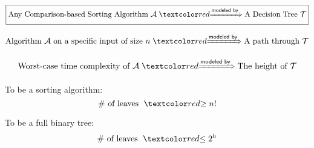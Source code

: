\begin{frame}{}
  \begin{center}
    {\Large {}} 
  \end{center}

  \vspace{-0.40cm}
  \[
    \boxed{\text{Any Comparison-based Sorting Algorithm } \mathcal{A} \;\red{\xRightarrow{\textsf{modeled by}}}\; \text{A Decision Tree } \mathcal{T}}
  \]

  \pause
  \[
    \text{Algorithm $\mathcal{A}$ on a specific input of size } n \;\red{\xRightarrow{\textsf{modeled by}}}\; \text{A path through } \mathcal{T}
  \]

  \pause
  \[
    \text{Worst-case time complexity of $\mathcal{A}$} \;\red{\xRightarrow{\textsf{modeled by}}}\; \text{The height of } \mathcal{T}
  \]

  \pause
  \vspace{0.50cm}
  \centering
\end{frame}

\begin{frame}{}
  \centering

  \pause
  \vspace{0.30cm}
  \begin{alertblock}{To be a  sorting algorithm:}
    \[
      \# \text{ of leaves } \;\red{\ge}\; n!
    \]
  \end{alertblock}

  \pause
  \vspace{0.50cm}
  \begin{alertblock}{To be a full binary tree:}
    \[
      \# \text{ of leaves } \;\red{\le}\; 2^h
    \]
  \end{alertblock}
\end{frame}

